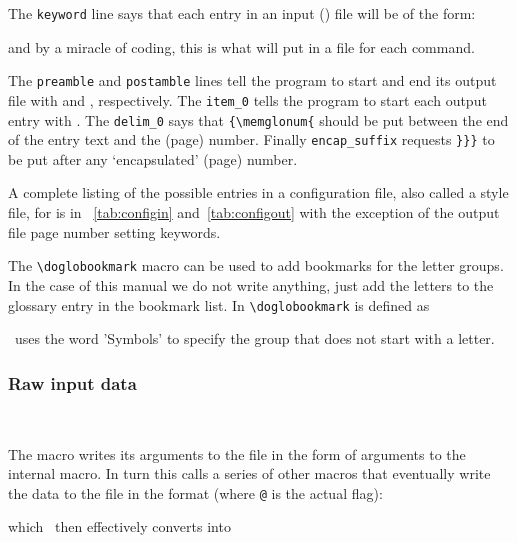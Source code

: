 The \verb?keyword? line says that each entry in an input () file
will be of the form:
\begin{lcode}
\end{lcode}
and by a miracle of coding, this is what  will put in a 
 file for each \cmd{\glossary} command.

    The \verb?preamble? and \verb?postamble? lines tell the program to start
and end its output file with  and ,
respectively.
The \verb?item_0? tells the program to start each output entry with
\cmd{\glossitem}. The \verb?delim_0? says that \verb?{\memglonum{?
should be put between the end of the entry text and the (page) number. Finally
\verb?encap_suffix? requests \verb?}}}? to be put after any `encapsulated'
(page) number.

    A complete listing of the possible entries in a configuration file,
also called a style file, for \Lmakeindex{} is in 
\tablerefname~\ref{tab:configin} and~\ref{tab:configout} with the exception
of the output file page number setting keywords.

The \verb?\doglobookmark? macro can be used to add bookmarks for the
letter groups. In the case of this manual we do not write anything,
just add the letters to the glossary entry in the bookmark list. In
 \verb?\doglobookmark? is defined as
\begin{lcode}
\newcommand\doglobookmark[1]{%
  \def\@tempa{Symbols}\def\@tempb{#1}%
  \ifx\@tempa\@tempb %
  \phantomsection\pdfbookmark[0]{Analphabetics}{Analphabetics-glo}%
  \else%
  \phantomsection\pdfbookmark[0]{#1}{#1-glo}%
  \fi%
}
\end{lcode}
\Lmakeindex\ uses the word 'Symbols' to specify the group that does not
start with a letter.


\subsubsection{Raw input data}

\begin{syntax}
\cmd{\@@wrglom@m}\\
\end{syntax}
The \cmd{\glossary} macro writes its arguments to the  file
in the form of arguments to the \cmd{\@@wrglom@m} internal macro. In turn 
this calls a series of other macros that eventually write the data
to the   file 
in the format (where \verb+@+ is the actual flag):
\begin{lcode}
\end{lcode}
which \Lmakeindex\ then effectively converts into
\begin{lcode}
           {}
\end{lcode}

